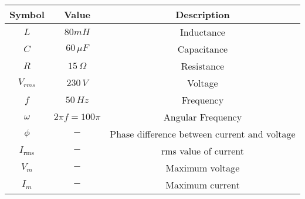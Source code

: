\begin{tabular}{|c|c|c|}
	\hline
	\textbf{Symbol} & \textbf{Value} &
	\textbf{Description}\\[6pt]
	\hline
	$L$ &  $80mH$ & Inductance\\[6pt]
	\hline 
	$C$ &  $60\, \mu F$ & Capacitance \\[6pt]
	\hline
	$R$ &  $15\, \Omega$ & Resistance\\[6pt]
	\hline
	$V_{rms}$ & $230\, V$ & Voltage\\[6pt]
	\hline
	$f$ & $50\, {Hz}$ & Frequency\\[6pt]
	\hline
	$\omega$ & $2\pi f=100\pi$ & Angular Frequency\\[6pt]
	\hline
	$\phi$ & $-$ & Phase difference between current and voltage\\[6pt]
	\hline
	$I_ \text{rms}$ & $-$ & rms value of current\\
	\hline
	$V_m$ & $-$ & Maximum voltage\\
	\hline
	$I_m$ & $-$ & Maximum current\\
	\hline
\end{tabular}